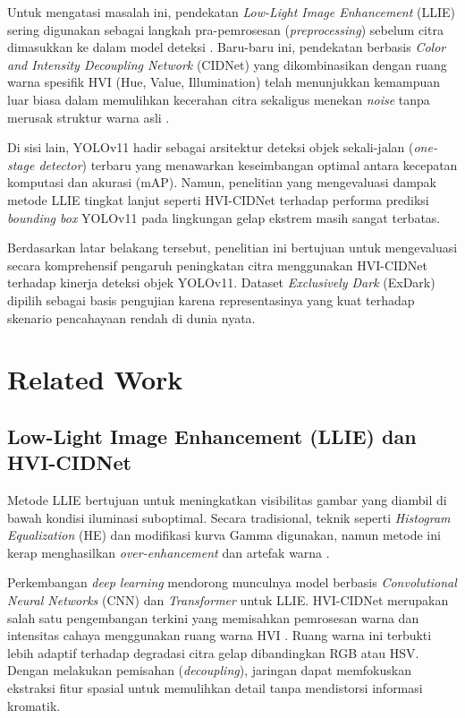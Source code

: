 \documentclass[conference]{IEEEtran}
\begin{document}
Untuk mengatasi masalah ini, pendekatan \textit{Low-Light Image Enhancement} (LLIE) sering digunakan sebagai langkah pra-pemrosesan (\textit{preprocessing}) sebelum citra dimasukkan ke dalam model deteksi \cite{llie_benchmark}. Baru-baru ini, pendekatan berbasis \textit{Color and Intensity Decoupling Network} (CIDNet) yang dikombinasikan dengan ruang warna spesifik HVI (Hue, Value, Illumination) telah menunjukkan kemampuan luar biasa dalam memulihkan kecerahan citra sekaligus menekan \textit{noise} tanpa merusak struktur warna asli \cite{hvi_cidnet}. 

Di sisi lain, YOLOv11 hadir sebagai arsitektur deteksi objek sekali-jalan (\textit{one-stage detector}) terbaru yang menawarkan keseimbangan optimal antara kecepatan komputasi dan akurasi (mAP). Namun, penelitian yang mengevaluasi dampak metode LLIE tingkat lanjut seperti HVI-CIDNet terhadap performa prediksi \textit{bounding box} YOLOv11 pada lingkungan gelap ekstrem masih sangat terbatas.

Berdasarkan latar belakang tersebut, penelitian ini bertujuan untuk mengevaluasi secara komprehensif pengaruh peningkatan citra menggunakan HVI-CIDNet terhadap kinerja deteksi objek YOLOv11. Dataset \textit{Exclusively Dark} (ExDark) dipilih sebagai basis pengujian karena representasinya yang kuat terhadap skenario pencahayaan rendah di dunia nyata.

\section{Related Work}

\subsection{Low-Light Image Enhancement (LLIE) dan HVI-CIDNet}
Metode LLIE bertujuan untuk meningkatkan visibilitas gambar yang diambil di bawah kondisi iluminasi suboptimal. Secara tradisional, teknik seperti \textit{Histogram Equalization} (HE) dan modifikasi kurva Gamma digunakan, namun metode ini kerap menghasilkan \textit{over-enhancement} dan artefak warna \cite{llie_benchmark}. 

Perkembangan \textit{deep learning} mendorong munculnya model berbasis \textit{Convolutional Neural Networks} (CNN) dan \textit{Transformer} untuk LLIE. HVI-CIDNet merupakan salah satu pengembangan terkini yang memisahkan pemrosesan warna dan intensitas cahaya menggunakan ruang warna HVI \cite{hvi_cidnet}. Ruang warna ini terbukti lebih adaptif terhadap degradasi citra gelap dibandingkan RGB atau HSV. Dengan melakukan pemisahan (\textit{decoupling}), jaringan dapat memfokuskan ekstraksi fitur spasial untuk memulihkan detail tanpa mendistorsi informasi kromatik.
\end{document}
